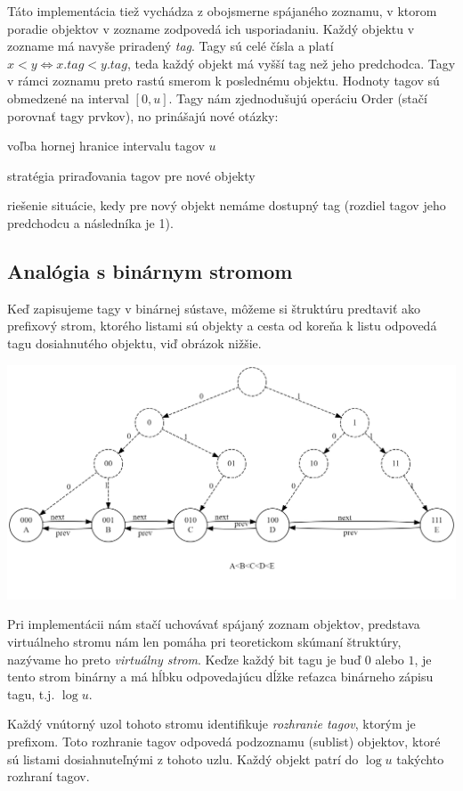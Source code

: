 \documentclass[
  digital,     %
  oneside,     %
  nosansbold,  %
  nocolorbold, %
  lof,         %
  lot,         %
]{fithesis4}
\begin{document}
Táto implementácia tiež vychádza z obojsmerne spájaného zoznamu, v ktorom poradie objektov v zozname zodpovedá ich usporiadaniu. Každý objektu v zozname má navyše priradený \textit{tag}. Tagy sú celé čísla a platí $x < y \iff x.tag < y.tag$, teda každý objekt má vyšší tag než jeho predchodca. Tagy v rámci zoznamu preto rastú smerom k poslednému objektu. Hodnoty tagov sú obmedzené na interval $[0, u]$. Tagy nám zjednodušujú operáciu Order (stačí porovnať tagy prvkov), no prinášajú nové otázky:
\begin{compactenum}
  \item voľba hornej hranice intervalu tagov $u$
  \item stratégia priraďovania tagov pre nové objekty
  \item riešenie situácie, kedy pre nový objekt nemáme dostupný tag (rozdiel tagov jeho predchodcu a následníka je 1).
\end{compactenum}

\subsection*{Analógia s binárnym stromom}
Keď zapisujeme tagy v binárnej sústave, môžeme si štruktúru predtaviť ako prefixový strom, ktorého listami sú objekty a cesta od koreňa k listu odpovedá tagu dosiahnutého objektu, viď obrázok nižšie.

\includegraphics[width=\textwidth]{graphics/graphviz.png}

Pri implementácii nám stačí uchovávať spájaný zoznam objektov, predstava virtuálneho stromu nám len pomáha pri teoretickom skúmaní štruktúry, nazývame ho preto \textit{virtuálny strom}. Keďze každý bit tagu je buď $0$ alebo $1$, je tento strom binárny a má hĺbku odpovedajúcu dĺžke reťazca binárneho zápisu tagu, t.j. $\log{u}$.

Každý vnútorný uzol tohoto stromu identifikuje \textit{rozhranie tagov}, ktorým je prefixom. Toto rozhranie tagov odpovedá podzoznamu (sublist) objektov, ktoré sú listami dosiahnuteľnými z tohoto uzlu. Každý objekt patrí do $\log{u}$ takýchto rozhraní tagov.
\end{document}
